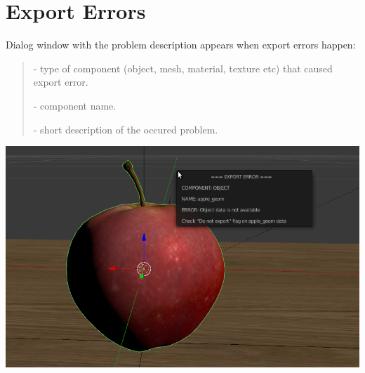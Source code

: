 \documentclass[a4paper,12pt,oneside]{sphinxmanual}
\begin{document}

\section{Export Errors}
\label{addon:export-errors}\label{addon:index-1}\label{addon:id3}
Dialog window  with the problem description appears when export errors happen:
\begin{quote}

 - type of component (object, mesh, material, texture etc) that caused export error.

 - component name.

 - short description of the occured problem.
\end{quote}

{\hfill\includegraphics[width=1.000\linewidth]{error_message.jpg}\hfill}

\begin{DUlineblock}{0em}
\item[] 
\end{DUlineblock}
\end{document}
